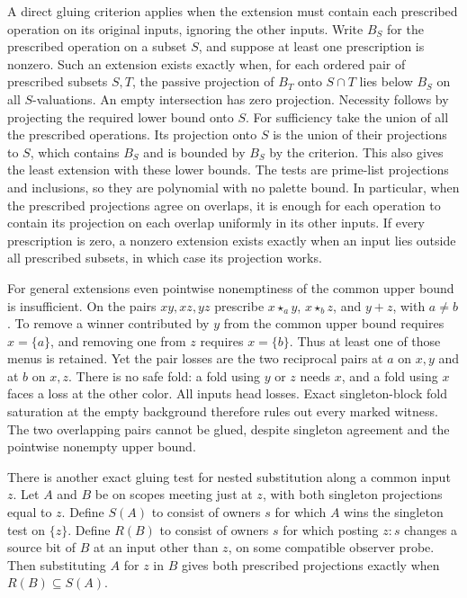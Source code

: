 A direct gluing criterion applies when the extension
must contain each prescribed operation on its
original inputs, ignoring the other inputs. Write
$B_S$ for the prescribed operation on a subset $S$,
and suppose at least one prescription is nonzero.
Such an extension exists exactly when, for each
ordered pair of prescribed subsets $S,T$, the
passive projection of $B_T$ onto $S\cap T$ lies
below $B_S$ on all $S$-valuations. An empty
intersection has zero projection. Necessity
follows by projecting the required lower bound
onto $S$. For sufficiency take the union of all
the prescribed operations. Its projection onto
$S$ is the union of their projections to $S$,
which contains $B_S$ and is bounded by $B_S$
by the criterion. This also gives the least
extension with these lower bounds. The tests
are prime-list projections and inclusions,
so they are polynomial with no palette bound.
In particular, when the prescribed projections
agree on overlaps, it is enough for each
operation to contain its projection on each
overlap uniformly in its other inputs.
If every prescription is zero, a nonzero extension
exists exactly when an input lies outside all
prescribed subsets, in which case its projection
works.

For general extensions even pointwise nonemptiness
of the common upper bound is insufficient. On the
pairs $xy,xz,yz$ prescribe $x\star_a y$,
$x\star_b z$, and $y+z$, with $a\ne b$. To
remove a winner contributed by $y$ from the
common upper bound requires $x=\{a\}$, and
removing one from $z$ requires $x=\{b\}$.
Thus at least one of those menus is retained.
Yet the pair losses are the two reciprocal
pairs at $a$ on $x,y$ and at $b$ on $x,z$.
There is no safe fold: a fold using $y$ or $z$
needs $x$, and a fold using $x$ faces a loss
at the other color. All inputs head losses.
Exact singleton-block fold saturation at the
empty background therefore rules out every
marked witness. The two overlapping pairs
cannot be glued, despite singleton agreement
and the pointwise nonempty upper bound.

There is another exact gluing test for nested
substitution along a common input $z$. Let $A$
and $B$ be on scopes meeting just at $z$, with
both singleton projections equal to $z$. Define
$S(A)$ to consist of owners $s$ for which $A$ wins
the singleton test on $\{z\}$. Define $R(B)$ to
consist of owners $s$ for which posting $z:s$
changes a source bit of $B$ at an input other
than $z$, on some compatible observer probe.
Then substituting $A$ for $z$ in $B$ gives
both prescribed projections exactly when
$R(B)\subseteq S(A)$.

